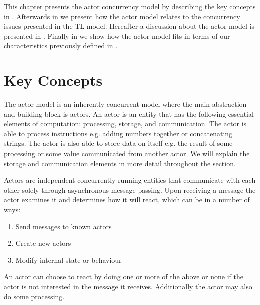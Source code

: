 \makeatletter {}\makeatother
{}
This chapter presents the actor concurrency model by describing the key concepts in . Afterwards in  we present how the actor model relates to the concurrency issues presented in the \ac{TL} model. Hereafter a discussion about the actor model is presented in . Finally in  we show how the actor model fits in terms of our characteristics previously defined in .

\section{Key Concepts}\label{sec:actor_concepts}
The actor model is an inherently concurrent model where the main abstraction and building block is actors\cite[p. 2]{karmani2009actor}. An actor is an entity that has the following essential elements of computation\cite{actorLangNextVideo}: processing, storage, and communication. The actor is able to process instructions e.g. adding numbers together or concatenating strings. The actor is also able to store data on itself e.g. the result of some processing or some value communicated from another actor. We will explain the storage and communication elements in more detail throughout the section.

Actors are independent concurrently running entities that communicate with each other solely through asynchronous message passing\cite[p. 304]{tasharofi2013scala}. Upon receiving a message the actor examines it and determines how it will react, which can be in a number of ways\cite[p. 2]{hewitt2014actor}:
\begin{enumerate}
\item Send messages to known actors
\item Create new actors
\item Modify internal state or behaviour
\end{enumerate}
An actor can choose to react by doing one or more of the above or none if the actor is not interested in the message it receives. Additionally the actor may also do some processing.

